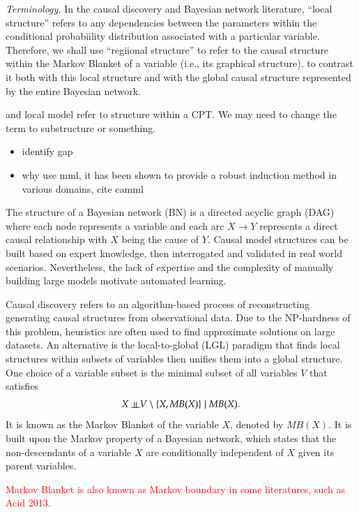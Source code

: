 \documentclass{svmult}
\begin{document}
{\em Terminology.} In the causal discovery and
Bayesian network literature, ``local structure'' refers to any
dependencies between the parameters within the conditional
probabiility distribution associated with a particular
variable. Therefore, we shall use ``regiional structure'' to refer to
the causal structure within the Markov Blanket of a variable (i.e.,
its graphical structure), to contrast it both with this local
structure and with the global causal structure represented by the
entire Bayesian network.

and local model refer to structure within a CPT. We may need to change the term to substructure or something.
\begin{itemize}
\item identify gap
\item why use mml, it has been shown to provide a robust induction method in various domains, cite camml
\end{itemize}

The structure of a Bayesian network (BN) is a directed acyclic graph (DAG) where each node represents a variable and each arc $X \to Y$ represents a direct causal relationship with $X$ being the cause of $Y$. Causal model structures can be built based on expert knowledge, then interrogated and validated in real world scenarios. Nevertheless, the lack of expertise and the complexity of manually building large models motivate automated learning. 

Causal discovery refers to an algorithm-based process of reconstructing generating causal structures from observational data. Due to the NP-hardness of this problem\cite{chickering1995learning}, heuristics are often used to find approximate solutions on large datasets. An alternative is the local-to-global (LGL) paradigm that finds local structures within subsets of variables then unifies them into a global structure. One choice of a variable subset is the minimal subset of all variables $V$ that satisfies  
\begin{align*}
X \indep V \setminus \{X, MB(X)\} \mid MB(X).
\end{align*}
It is known as the Markov Blanket \cite{pearl1988probabilistic}of the variable $X$, denoted by $MB(X)$. It is built upon the Markov property of a Bayesian network, which states that the non-descendants of a variable $X$ are conditionally independent of $X$ given its parent variables. 

\textcolor{red}{Markov Blanket is also known as Markov boundary in some literatures, such as Acid 2013}. 
\end{document}
